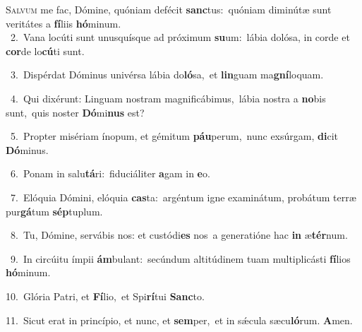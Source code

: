 \lettrine{\initial\textcolor{\initialcolor}{S}}{alvum} me fac, Dómine, quóniam defécit \textbf{sanc}\-tus:~\star quóniam diminútæ sunt veritátes a \textbf{fí}\-liis \textbf{hó}\-minum.\\
{\numbfont\textcolor{\numbcolor}{~2.}}~Vana locúti sunt unusquísque ad próximum \textbf{su}\-um:~\star lábia dolósa, in corde et \textbf{cor}\-de lo\-\textbf{cú}\-ti sunt.\par
{\numbfont\textcolor{\numbcolor}{~3.}}~Dispérdat Dóminus univérsa lábia do\-\textbf{ló}\-sa,~\star et \textbf{lin}\-guam ma\-\textbf{gní}\-loquam.\par
{\numbfont\textcolor{\numbcolor}{~4.}}~Qui dixérunt: Linguam nostram magnificábimus,~\dagger lábia nostra a \textbf{no}\-bis sunt,~\star quis noster \textbf{Dó}\-mi\textbf{nus} est?\par
{\numbfont\textcolor{\numbcolor}{~5.}}~Propter misériam ínopum, et gémitum \textbf{páu}\-perum,~\star nunc exsúrgam, \textbf{di}\-cit \textbf{Dó}\-minus.\par
{\numbfont\textcolor{\numbcolor}{~6.}}~Ponam in salu\-\textbf{tá}\-ri:~\star fiduciáliter \textbf{a}\-gam in \textbf{e}\-o.\par
{\numbfont\textcolor{\numbcolor}{~7.}}~Elóquia Dómini, elóquia \textbf{cas}\-ta:~\star argéntum igne examinátum, probátum terræ pur\-\textbf{gá}\-tum \textbf{sép}\-tuplum.\par
{\numbfont\textcolor{\numbcolor}{~8.}}~Tu, Dómine, servábis nos: et custódi\textbf{es} nos~\star a generatióne hac \textbf{in} æ\-\textbf{tér}\-num.\par
{\numbfont\textcolor{\numbcolor}{~9.}}~In circúitu ímpii \textbf{ám}\-bulant:~\star secúndum altitúdinem tuam multiplicásti \textbf{fí}\-lios \textbf{hó}\-minum.\par
{\numbfont\textcolor{\numbcolor}{10.}}~Glória Patri, et \textbf{Fí}\-lio,~\star et Spi\-\textbf{rí}\-tui \textbf{Sanc}\-to.\par
{\numbfont\textcolor{\numbcolor}{11.}}~Sicut erat in princípio, et nunc, et \textbf{sem}\-per,~\star et in sǽcula sæcu\-\textbf{ló}\-rum. \textbf{A}\-men.\par
